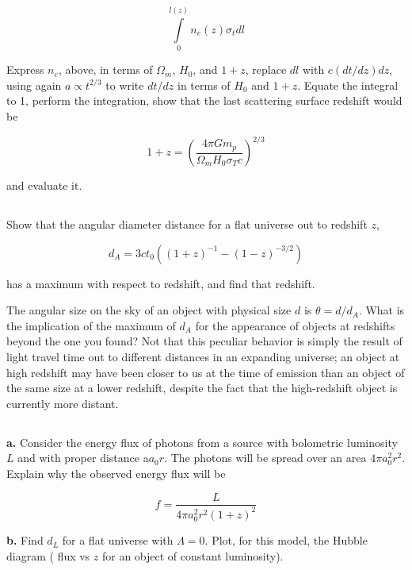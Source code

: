 \documentclass[12pt]{article}
\begin{document}
\[ \int\limits_0^{l(z)} n_e(z)\sigma_t dl
\]

Express \(n_e\), above, in terms of \(\Omega_m\), \(H_0\), and \(1+z\), replace \(dl\) with \( c(dt/dz)dz \), using again \(a \propto t^{2/3}\) to write \(dt/dz\) in terms of \(H_0\) and \(1+z\). Equate the integral to 1, perform the integration, show that the last scattering surface redshift would be

\[1+z = \left( \frac{4\pi G m_p}{\Omega_m H_0 \sigma_T c}\right)^{2/3}
\]

and evaluate it.

\subsection{} %

Show that the angular diameter distance for a flat universe out to redshift \(z\),

\[ d_A = 3ct_0\left( (1+z)^{-1} - (1-z)^{-3/2} \right)
\]

has a maximum with respect to redshift, and find that redshift.

The angular size on the sky of an object with physical size \(d\) is \(\theta=d/d_A\). What is the implication of the maximum of \(d_A\) for the appearance of objects at redshifts beyond the one you found? Not that this peculiar behavior is simply the result of light travel time out to different distances in an expanding universe; an object at high redshift may have been closer to us at the time of emission than an object of the same size at a lower redshift, despite the fact that the high-redshift object is currently more distant.


\subsection{} %

\textbf{a.} Consider the energy flux of photons from a source with bolometric luminosity \(L\) and with proper distance a\(a_0r\). The photons will be spread over an area \(4\pi a_0^2r^2\). Explain why the observed energy flux will be

\[ f = \frac{L}{4\pi a_0^2r^2(1+z)^2}
\]

\textbf{b.} Find \(d_L\) for a flat universe with \(\Lambda=0\). Plot, for this model, the Hubble diagram ( flux vs \(z\) for an object of constant luminosity).

\subsection{} %
\end{document}

